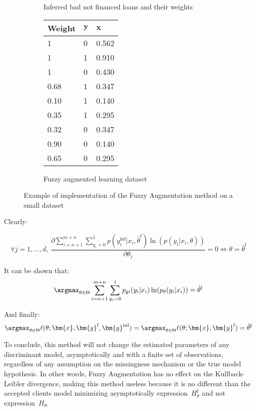 \begin{figure}
{\begin{multicols}{4}
\begin{subfigure}[t]{0.22\textwidth}
\caption{Inferred bad not financed loans and their weights}
\label{fuzzy:sfig3}
\end{subfigure}

\columnbreak

\begin{subfigure}[t]{0.22\textwidth}
\begin{center}
\begin{adjustbox}{max width=0.95\textwidth}
\begin{tabular}{l l l}
\toprule
\textbf{Weight} & \textbf{${\bm{y}}$} & \textbf{${\bm{x}}$}\\
\midrule
1 & 0 & 0.562 \\
1 & 1 & 0.910 \\
1 & 0 & 0.430 \\
0.68 & 1 & 0.347 \\
0.10 & 1 & 0.140 \\
0.35 & 1 & 0.295 \\
0.32 & 0 & 0.347 \\
0.90 & 0 & 0.140 \\
0.65 & 0 & 0.295 \\
\bottomrule
\end{tabular}
\end{adjustbox}
\end{center}
\caption{Fuzzy augmented learning dataset}
\label{fuzzy:sfig4}
\end{subfigure}

\end{multicols}
}
\caption{Example of implementation of the Fuzzy Augmentation method on a small dataset}
\label{fuzzyexample}
\end{figure}

 Clearly:

 \[ \forall j = 1, \ldots, d, \: \frac{\partial \sum_{i=n+1}^{m+n} \sum_{y_i = 0}^{1} p(y_i^{\text{inf}}| x_i, \hat{\theta}^{\text{f}})\ln (p(y_i| x_i, \theta))}{\partial \theta_j} = 0 \Leftrightarrow \theta = \hat{\theta}^{\text{f}} \]

 It can be shown that:
 \[\argmax_{\theta \in \Theta}  \sum_{i=n+1}^{m+n} \sum_{y_i = 0}^{1} p_{\hat{\theta}^{\text{f}}}(y_i| x_i)\ln (p_\theta(y_i| x_i)) = \hat{\theta}^{\text{f}}\]

 And finally:
 \[\argmax_{\theta \in \Theta} \ell(\theta;{\bm{x}},{\bm{y}}^{\text{f}},{\bm{y}}^{\text{inf}}) = \argmax_{\theta \in \Theta} \ell(\theta;{\bm{x}},{\bm{y}}^{\text{f}}) = \hat{\theta}^{\text{f}}\]

 To conclude, this method will not change the estimated parameters of any discriminant model, asymptotically and with a finite set of observations, regardless of any assumption on the missingness mechanism or the true model hypothesis. In other words, Fuzzy Augmentation has no effect on the Kullback-Leibler divergence, making this method useless because it is no different than the accepted clients model minimizing asymptotically expression~$H^{\text{f}}_{\theta}$ and not expression~$H_{\theta}$.


